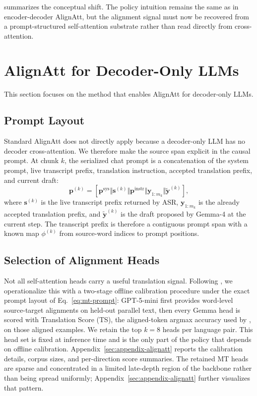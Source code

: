 \documentclass[11pt]{article}
\begin{document}
 summarizes the conceptual shift. The
policy intuition remains the same as in encoder-decoder AlignAtt, but the
alignment signal must now be recovered from a prompt-structured self-attention
substrate rather than read directly from cross-attention.



\section{AlignAtt for Decoder-Only LLMs}
\label{sec:method}

This section focuses on the method that enables AlignAtt for decoder-only LLMs.

\subsection{Prompt Layout}

Standard AlignAtt does not directly apply because a decoder-only LLM has no
decoder cross-attention. We therefore make the source span explicit in the
causal prompt. At chunk $k$, the serialized chat prompt is a concatenation of
the system prompt, live transcript prefix, translation instruction, accepted
translation prefix, and current draft:
\begin{equation}
\mathbf{p}^{(k)} =
\left[\mathbf{p}^{\mathrm{sys}}
\Vert \mathbf{s}^{(k)}
\Vert \mathbf{p}^{\mathrm{instr}}
\Vert \mathbf{y}_{1:m_k}
\Vert \widetilde{\mathbf{y}}^{(k)}\right],
\label{eq:mt-prompt}
\end{equation}
where $\mathbf{s}^{(k)}$ is the live transcript prefix returned by ASR,
$\mathbf{y}_{1:m_k}$ is the already accepted translation prefix, and
$\widetilde{\mathbf{y}}^{(k)}$ is the draft proposed by Gemma-4 at the current
step. The transcript prefix is therefore a contiguous prompt span with a known
map $\phi^{(k)}$ from source-word indices to prompt positions.

\subsection{Selection of Alignment Heads}

Not all self-attention heads carry a useful translation signal.
Following \citet{tokenheads26}, we operationalize this
with a two-stage offline calibration procedure under the exact prompt layout of
Eq.~\eqref{eq:mt-prompt}: GPT-5-mini \citep{openai2025gpt5developers} first
provides word-level source-target alignments on held-out parallel text, then
every Gemma head is scored with Translation Score (TS), the aligned-token
argmax accuracy used by \citet{tokenheads26}, on those aligned examples. We
retain the top $k=8$ heads per language pair. This head set is
fixed at inference time and is the only part of the policy that depends on
offline calibration.
Appendix~\ref{sec:appendix-alignatt} reports the calibration details, corpus
sizes, and per-direction score summaries. The retained MT heads are sparse and
concentrated in a limited late-depth region of the backbone rather than being
spread uniformly; Appendix~\ref{sec:appendix-alignatt} further visualizes that pattern.
\end{document}
